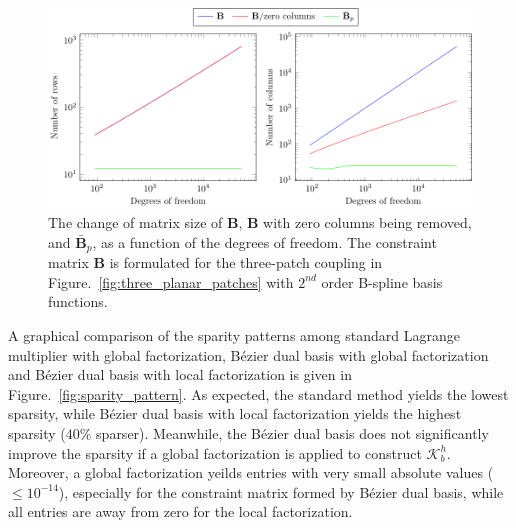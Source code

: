 \documentclass[preprint,12pt]{elsarticle}
\newcommand{\Bezier}{{B\'{e}zier} }
\theoremstyle{remark}
\begin{document}
\begin{figure}[hbt]
	\centering
    \includegraphics[width=\linewidth]{size_vs_dof}
	\caption{The change of matrix size of $\mathbf{B}$, $\mathbf{B}$ with zero columns being removed, and $\bar{\mathbf{B}}_p$, as a function of the degrees of freedom. The constraint matrix $\mathbf{B}$ is formulated for the three-patch coupling in Figure.~\ref{fig:three_planar_patches} with $2^{nd}$ order B-spline basis functions.}\label{fig:size_evolution}
\end{figure}

A graphical comparison of the sparity patterns among standard Lagrange multiplier with global factorization, \Bezier dual basis with global factorization and \Bezier dual basis with local factorization is given in Figure.~\ref{fig:sparity_pattern}. As expected, the standard method yields the lowest sparsity, while \Bezier dual basis with local factorization yields the highest sparsity ($40\%$ sparser). Meanwhile, the \Bezier dual basis does not significantly improve the sparsity if a global factorization is applied to construct $\mathcal{K}_b^h$. Moreover, a global factorization yeilds entries with very small absolute values ($\leq{}10^{-14}$), especially for the constraint matrix formed by \Bezier dual basis, while all entries are away from zero for the local factorization. 
\end{document}
